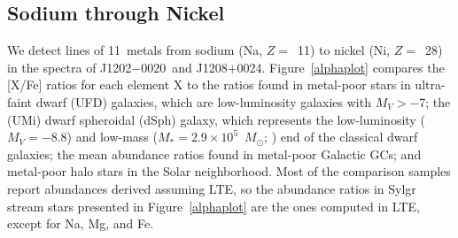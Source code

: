 \documentclass[twocolumn,tighten]{aastex62}
\newcommand{\jtwo}{J1202$-$0020}
\newcommand{\jeight}{J1208$+$0024}
\newcommand{\msun}{\mbox{$M_{\odot}$}}
\begin{document}
\subsection{Sodium through Nickel}
\label{alphairon}


We detect lines of 11~metals from sodium (Na, $Z =$~11) 
to nickel (Ni, $Z =$~28)
in the spectra of \jtwo\ and \jeight.
Figure~\ref{alphaplot} compares the [X/Fe] ratios for each element X
to the ratios found in metal-poor stars in 
ultra-faint dwarf (UFD) galaxies,
which are low-luminosity galaxies with $M_V > -$7;
the  (UMi) dwarf spheroidal (dSph) galaxy,
which represents the low-luminosity ($M_V = -$8.8) 
and low-mass ($M_{*} = 2.9 \times 10^{5}$~\msun; \citealt{mcconnachie12}) 
end of the classical dwarf galaxies;
the mean abundance ratios found in metal-poor Galactic GCs;
and metal-poor halo stars in the Solar neighborhood.
Most of the comparison samples report abundances derived
assuming LTE, so the abundance ratios in Sylgr stream stars
presented in Figure~\ref{alphaplot} are the ones computed
in LTE, except for Na, Mg, and Fe.
\end{document}
